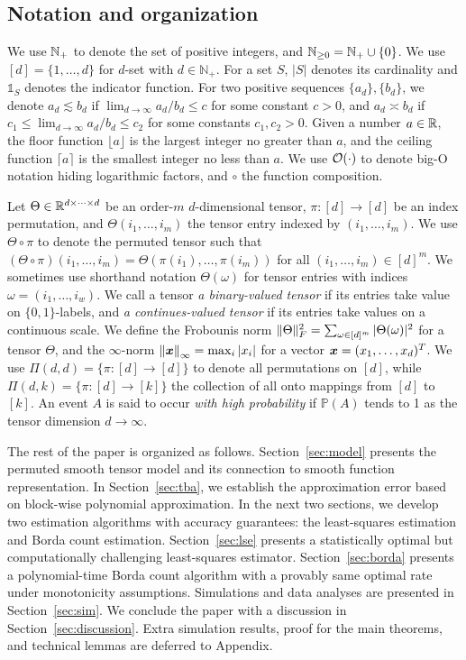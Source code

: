 \documentclass[11pt]{article}
\theoremstyle{definition}
\begin{document}
\subsection{Notation and organization}
We use $\mathbb{N}_{+}$ to denote the set of positive integers, and $\mathbb{N}_{\geq 0}=\mathbb{N}_{+}\cup\{0\}$.
We use $[d]=\{1,\ldots,d\}$ for $d$-set with $d\in\mathbb{N}_{+}$. For a set $S$, $|S|$ denotes its cardinality and $\mathds{1}_S$ denotes the indicator function. For two positive sequences $\{a_d\},\{b_d\}$,  we denote $a_d\lesssim b_d$ if $\lim_{d\to\infty} a_d/b_d\leq c$ for some constant $c>0$, and $a_d\asymp b_d$ if $c_1\leq \lim_{d\to \infty} a_d/b_d\leq c_2$ for some constants $c_1,c_2>0$. Given a number $a\in\mathbb{R}$, the floor function $\lfloor a\rfloor$ is the largest integer no greater than $a$, and the ceiling function $\lceil a\rceil$ is the smallest integer no less than $a$. We use $\mathcal{O}(\cdot)$ to denote big-O notation hiding logarithmic factors, and $\circ$ the function composition. 

Let $\Theta\in\mathbb{R}^{d\times \cdots \times d}$ be an order-$m$ $d$-dimensional tensor, $\pi\colon[d]\rightarrow[d]$ be an index permutation, and $\Theta(i_1,\ldots,i_m)$ the tensor entry indexed by $(i_1,\ldots,i_m)$. We use $\Theta\circ\pi$ to denote the permuted tensor such that $(\Theta\circ\pi)(i_1,\ldots,i_m) = \Theta(\pi(i_1),\ldots,\pi(i_m))$ for all $(i_1,\ldots,i_m)\in[d]^m$. We sometimes  use shorthand notation $\Theta(\omega)$ for tensor entries with indices $\omega=(i_1,\ldots,i_w)$. We call a tensor \emph{a binary-valued tensor} if its entries take value on $\{0,1\}$-labels, and \emph{a continues-valued tensor} if its entries take values on a continuous scale. We define the Frobounis norm $\lVert\Theta\rVert_F^2=\sum_{\omega\in[d]^m}|\Theta(\omega)|^2$ for a tensor $\Theta$, and the $\infty$-norm $\left\lVert\bm x\right\rVert_\infty=\max_{i}|x_i|$ for a vector $\bm x=(x_1,\ldots,x_d)^T$.
We use $\Pi(d,d)=\{\pi\colon [d]\to[d]\}$ to denote all permutations on $[d]$, while $\Pi(d,k)=\{\pi\colon [d]\to[k]\}$ the collection of all onto mappings from $[d]$ to $[k]$. An event $A$ is said to occur \emph{with high probability} if $\mathbb{P}(A)$ tends to 1 as the tensor dimension $d\to\infty$. 


The rest of the paper is organized as follows. Section~\ref{sec:model} presents the permuted smooth tensor model and its connection to smooth function representation. In Section~\ref{sec:tba}, we establish the approximation error based on block-wise polynomial approximation. In the next two sections,  we develop two estimation algorithms with accuracy guarantees: the least-squares estimation and Borda count estimation. Section~\ref{sec:lse} presents a statistically optimal but computationally challenging least-squares estimator. Section~\ref{sec:borda} presents a polynomial-time Borda count algorithm with a provably same optimal rate under monotonicity assumptions. Simulations and data analyses are presented in Section~\ref{sec:sim}.  We conclude the paper with a discussion in Section~\ref{sec:discussion}. Extra simulation results, proof for the main theorems, and technical lemmas are deferred to Appendix. 
\end{document}
